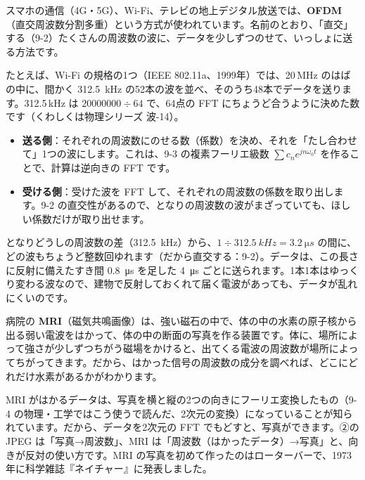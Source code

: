 \label{bk:9-12:ofdm}スマホの通信（4G・5G）、Wi-Fi、テレビの地上デジタル放送では、\textbf{OFDM}（直交周波数分割多重）という方式が使われています。名前のとおり、「直交」する（9-2）たくさんの周波数の波に、データを少しずつのせて、いっしょに送る方法です。

たとえば、Wi-Fi の規格の1つ（IEEE 802.11a、1999年）では、20\,MHz のはばの中に、間かく \qty{312.5}{kHz} の52本の波を並べ、そのうち48本でデータを送ります。312.5\,kHz は $\num{20000000}\div64$ で、64点の FFT にちょうど合うように決めた数です（くわしくは物理シリーズ 波-14）。

\begin{itemize}[leftmargin=1.2\zw, itemsep=2pt, topsep=2pt, label={\color{\bkTT}●}]
\item \textbf{送る側}：それぞれの周波数にのせる数（係数）を決め、それを「たし合わせて」1つの波にします。これは、9-3 の複素フーリエ級数 $\sum c_ne^{jn\omega_0t}$ を作ることで、計算は逆向きの FFT です。
\item \textbf{受ける側}：受けた波を FFT して、それぞれの周波数の係数を取り出します。9-2 の直交性があるので、となりの周波数の波がまざっていても、ほしい係数だけが取り出せます。
\end{itemize}
となりどうしの周波数の差（\qty{312.5}{kHz}）から、$1\div\qty{312.5}{kHz}=\qty{3.2}{\micro s}$ の間に、どの波もちょうど整数回ゆれます（だから直交する：9-2）。データは、この長さに反射に備えたすき間 \qty{0.8}{\micro s} を足した \qty{4}{\micro s} ごとに送られます。1本1本はゆっくり変わる波なので、建物で反射しておくれて届く電波があっても、データが乱れにくいのです。


\label{bk:9-12:mri}病院の \textbf{MRI}（磁気共鳴画像）は、強い磁石の中で、体の中の水素の原子核から出る弱い電波をはかって、体の中の断面の写真を作る装置です。体に、場所によって強さが少しずつちがう磁場をかけると、出てくる電波の周波数が場所によってちがってきます。だから、はかった信号の周波数の成分を調べれば、どこにどれだけ水素があるかがわかります。

MRI がはかるデータは、写真を横と縦の2つの向きにフーリエ変換したもの（9-4 の物理・工学ではこう使うで読んだ、2次元の変換）になっていることが知られています。だから、データを2次元の FFT でもどすと、写真ができます。②の JPEG は「写真→周波数」、MRI は「周波数（はかったデータ）→写真」と、向きが反対の使い方です。MRI の写真を初めて作ったのはローターバーで、1973年に科学雑誌『ネイチャー』に発表しました。


